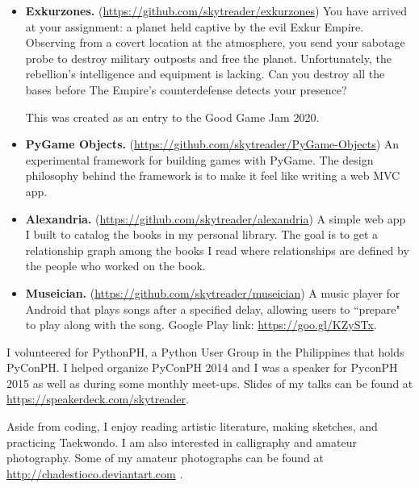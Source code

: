 \documentclass{article}
\begin{document}
    \begin{itemize}
      \item \textbf{Exkurzones.} (\url{https://github.com/skytreader/exkurzones})
      You have arrived at your assignment: a planet held captive by the evil Exkur Empire.
      Observing from a covert location at the atmosphere, you send your sabotage probe to
      destroy military outposts and free the planet. Unfortunately, the rebellion's
      intelligence and equipment is lacking. Can you destroy all the bases before
      The Empire's counterdefense detects your presence?

      This was created as an entry to the Good Game Jam 2020.
      

      \item \textbf{PyGame Objects.} (\url{https://github.com/skytreader/PyGame-Objects})
      An experimental framework for building games with PyGame. The design philosophy behind the framework
      is to make it feel like writing a web MVC app.


      \item \textbf{Alexandria.} (\url{https://github.com/skytreader/alexandria})
      A simple web app I built to catalog the books in my personal library. The goal is to
      get a relationship graph among the books I read where relationships are defined
      by the people who worked on the book.


      \item \textbf{Museician.} (\url{https://github.com/skytreader/museician})
      A music player for Android that plays songs after a specified delay, allowing
      users to ``prepare" to play along with the song. Google Play link:
      \url{https://goo.gl/KZySTx}.

    \end{itemize}

  \breather
  I volunteered for PythonPH, a Python User Group in the Philippines that holds PyConPH. I helped organize PyConPH 2014 and
  I was a speaker for PyconPH 2015 as well as during some monthly meet-ups. Slides of my talks can be found at \url{https://speakerdeck.com/skytreader}.

  Aside from coding, I enjoy reading artistic literature, making sketches, and practicing Taekwondo. I am also interested in
  calligraphy and amateur photography. Some of my amateur photographs can be found at \url{http://chadestioco.deviantart.com} .
  
\end{document}
